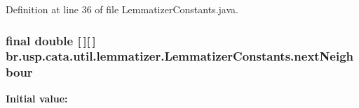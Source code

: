 Definition at line 36 of file Lemmatizer\+Constants.\+java.

\hypertarget{classbr_1_1usp_1_1cata_1_1util_1_1lemmatizer_1_1_lemmatizer_constants_a980c536444685e9764068d09140da5f0}{
\subsubsection[{next\+Neighbour}]{\setlength{\rightskip}{0pt plus 5cm}final double \mbox{[}$\,$\mbox{]}\mbox{[}$\,$\mbox{]} br.\+usp.\+cata.\+util.\+lemmatizer.\+Lemmatizer\+Constants.\+next\+Neighbour\hspace{0.3cm}{\ttfamily [static]}}}\label{classbr_1_1usp_1_1cata_1_1util_1_1lemmatizer_1_1_lemmatizer_constants_a980c536444685e9764068d09140da5f0}
{\bfseries Initial value\+:}
